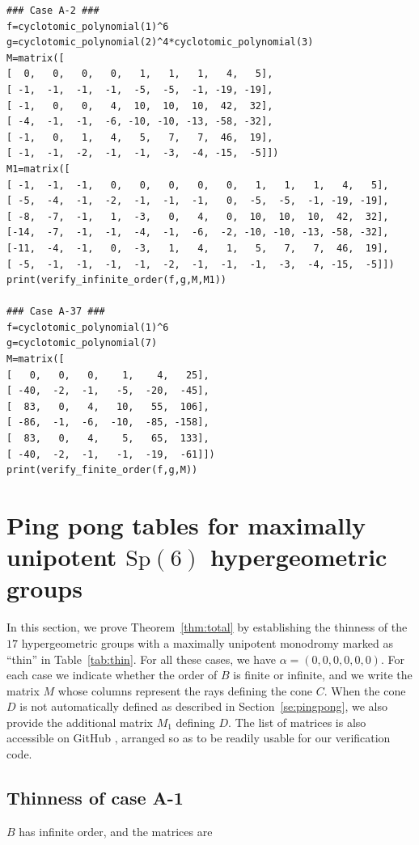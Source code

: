 \documentclass[11pt,a4paper]{amsart}
\theoremstyle{definition}
\theoremstyle{definition}
\numberwithin{equation}{section}
\newcommand{\Sp}{\mathrm{Sp}}
\begin{document}
\small
\begin{verbatim}
### Case A-2 ###
f=cyclotomic_polynomial(1)^6
g=cyclotomic_polynomial(2)^4*cyclotomic_polynomial(3)
M=matrix([
[  0,   0,   0,   0,   1,   1,   1,   4,   5],
[ -1,  -1,  -1,  -1,  -5,  -5,  -1, -19, -19],
[ -1,   0,   0,   4,  10,  10,  10,  42,  32],
[ -4,  -1,  -1,  -6, -10, -10, -13, -58, -32],
[ -1,   0,   1,   4,   5,   7,   7,  46,  19],
[ -1,  -1,  -2,  -1,  -1,  -3,  -4, -15,  -5]])
M1=matrix([
[ -1,  -1,  -1,   0,   0,   0,   0,   0,   1,   1,   1,   4,   5],
[ -5,  -4,  -1,  -2,  -1,  -1,  -1,   0,  -5,  -5,  -1, -19, -19],
[ -8,  -7,  -1,   1,  -3,   0,   4,   0,  10,  10,  10,  42,  32],
[-14,  -7,  -1,  -1,  -4,  -1,  -6,  -2, -10, -10, -13, -58, -32],
[-11,  -4,  -1,   0,  -3,   1,   4,   1,   5,   7,   7,  46,  19],
[ -5,  -1,  -1,  -1,  -1,  -2,  -1,  -1,  -1,  -3,  -4, -15,  -5]])
print(verify_infinite_order(f,g,M,M1))

### Case A-37 ###
f=cyclotomic_polynomial(1)^6
g=cyclotomic_polynomial(7)
M=matrix([
[   0,   0,   0,    1,    4,   25],
[ -40,  -2,  -1,   -5,  -20,  -45],
[  83,   0,   4,   10,   55,  106],
[ -86,  -1,  -6,  -10,  -85, -158],
[  83,   0,   4,    5,   65,  133],
[ -40,  -2,  -1,   -1,  -19,  -61]])
print(verify_finite_order(f,g,M))
\end{verbatim}
\normalsize

\section{Ping pong tables for maximally unipotent \texorpdfstring{$\Sp(6)$}{Sp(6)} hypergeometric groups}\label{se:thinlist}

In this section, we prove Theorem~\ref{thm:total} by establishing the thinness of the $17$ hypergeometric groups with a maximally unipotent monodromy marked as ``thin'' in Table~\ref{tab:thin}. For all these cases, we have $\alpha=\left(0,0,0,0,0,0\right)$. For each case we indicate whether the order of $B$ is finite or infinite, and we write the matrix $M$ whose columns represent the rays defining the cone $C$. When the cone $D$ is not automatically defined as described in Section~\ref{se:pingpong}, we also provide the additional matrix $M_{1}$ defining $D$. The list of matrices is also accessible on GitHub \cite{BDN21-s}, arranged so as to be readily usable for our verification code.

\subsection{Thinness of case A-1}
$B$ has infinite order, and the matrices are
\end{document}
